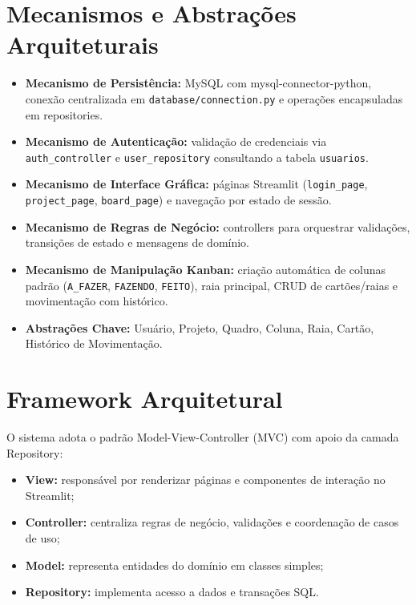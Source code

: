 \section{Mecanismos e Abstrações Arquiteturais}
\begin{itemize}
    \item \textbf{Mecanismo de Persistência:} MySQL com mysql-connector-python, conexão centralizada em \texttt{database/connection.py} e operações encapsuladas em repositories.
    \item \textbf{Mecanismo de Autenticação:} validação de credenciais via \texttt{auth\_controller} e \texttt{user\_repository} consultando a tabela \texttt{usuarios}.
    \item \textbf{Mecanismo de Interface Gráfica:} páginas Streamlit (\texttt{login\_page}, \texttt{project\_page}, \texttt{board\_page}) e navegação por estado de sessão.
    \item \textbf{Mecanismo de Regras de Negócio:} controllers para orquestrar validações, transições de estado e mensagens de domínio.
    \item \textbf{Mecanismo de Manipulação Kanban:} criação automática de colunas padrão (\texttt{A\_FAZER}, \texttt{FAZENDO}, \texttt{FEITO}), raia principal, CRUD de cartões/raias e movimentação com histórico.
    \item \textbf{Abstrações Chave:} Usuário, Projeto, Quadro, Coluna, Raia, Cartão, Histórico de Movimentação.
\end{itemize}

\section{Framework Arquitetural}
O sistema adota o padrão Model-View-Controller (MVC) com apoio da camada Repository:

\begin{itemize}
    \item \textbf{View:} responsável por renderizar páginas e componentes de interação no Streamlit;
    \item \textbf{Controller:} centraliza regras de negócio, validações e coordenação de casos de uso;
    \item \textbf{Model:} representa entidades do domínio em classes simples;
    \item \textbf{Repository:} implementa acesso a dados e transações SQL.
\end{itemize}

